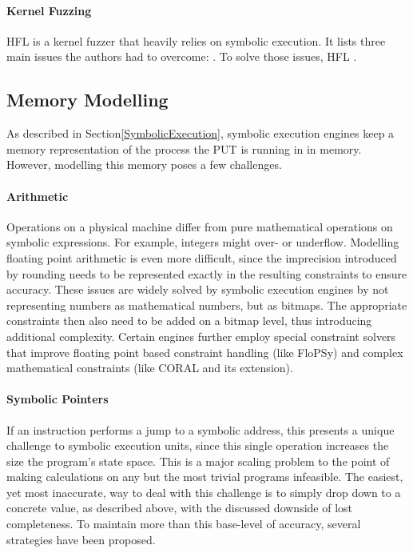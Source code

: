 \documentclass{article}
\begin{document}
\begin{multicols}{2}
    \paragraph{Kernel Fuzzing}
    HFL\cite{HFL} is a kernel fuzzer that heavily relies on symbolic execution. It lists three main issues the authors had to overcome: \cite{HFL}. To solve those issues, HFL \cite{HFL}.

    \subsection{Memory Modelling}
    As described in Section\ref{SymbolicExecution}, symbolic execution engines keep a memory representation of the process the PUT is running in in memory. However, modelling this memory poses a few challenges.

    \paragraph{Arithmetic}
    Operations on a physical machine differ from pure mathematical operations on symbolic expressions. For example, integers might over- or underflow. Modelling floating point arithmetic is even more difficult, since the imprecision introduced by rounding needs to be represented exactly in the resulting constraints to ensure accuracy. These issues are widely solved by symbolic execution engines by not representing numbers as mathematical numbers, but as bitmaps. The appropriate constraints then also need to be added on a bitmap level, thus introducing additional complexity. Certain engines further employ special constraint solvers that improve floating point based constraint handling (like FloPSy\cite{FloPSy}) and complex mathematical constraints (like CORAL\cite{CORAL} and its extension\cite{CORALAVM}).

    \paragraph{Symbolic Pointers}
    If an instruction performs a jump to a symbolic address, this presents a unique challenge to symbolic execution units, since this single operation increases the size the program's state space. This is a major scaling problem to the point of making calculations on any but the most trivial programs infeasible. The easiest, yet most inaccurate, way to deal with this challenge is to simply drop down to a concrete value, as described above, with the discussed downside of lost completeness. To maintain more than this base-level of accuracy, several strategies have been proposed.


\end{multicols}
\end{document}
